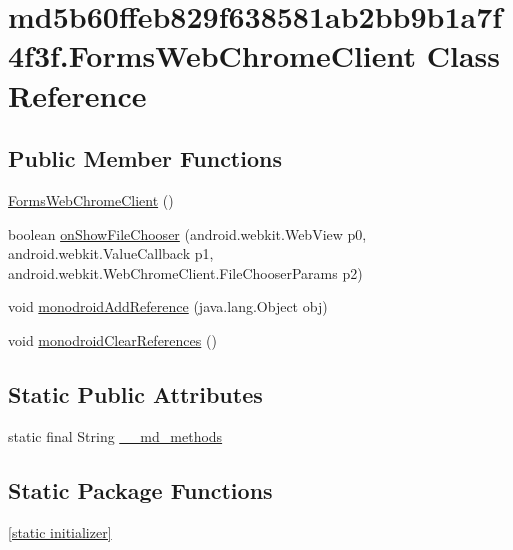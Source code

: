 \hypertarget{classmd5b60ffeb829f638581ab2bb9b1a7f4f3f_1_1_forms_web_chrome_client}{
\section{md5b60ffeb829f638581ab2bb9b1a7f4f3f.FormsWebChromeClient Class Reference}
\label{classmd5b60ffeb829f638581ab2bb9b1a7f4f3f_1_1_forms_web_chrome_client}
}
\subsection*{Public Member Functions}
\begin{CompactItemize}
\item 
\hyperlink{classmd5b60ffeb829f638581ab2bb9b1a7f4f3f_1_1_forms_web_chrome_client_c303a89a6191088c88020e6de82fe7db}{FormsWebChromeClient} ()
\item 
boolean \hyperlink{classmd5b60ffeb829f638581ab2bb9b1a7f4f3f_1_1_forms_web_chrome_client_870ec31fb8f8d9e959487609161690fc}{onShowFileChooser} (android.webkit.WebView p0, android.webkit.ValueCallback p1, android.webkit.WebChromeClient.FileChooserParams p2)
\item 
void \hyperlink{classmd5b60ffeb829f638581ab2bb9b1a7f4f3f_1_1_forms_web_chrome_client_9a31a7d0228c24952476bc4cfc6e78df}{monodroidAddReference} (java.lang.Object obj)
\item 
void \hyperlink{classmd5b60ffeb829f638581ab2bb9b1a7f4f3f_1_1_forms_web_chrome_client_e810253c0c2adc00084f02ce56257c9c}{monodroidClearReferences} ()
\end{CompactItemize}
\subsection*{Static Public Attributes}
\begin{CompactItemize}
\item 
static final String \hyperlink{classmd5b60ffeb829f638581ab2bb9b1a7f4f3f_1_1_forms_web_chrome_client_cdbbbfa40f7a32b9cc6eaabbd04669e5}{\_\-\_\-md\_\-methods}
\end{CompactItemize}
\subsection*{Static Package Functions}
\begin{CompactItemize}
\item 
\hyperlink{classmd5b60ffeb829f638581ab2bb9b1a7f4f3f_1_1_forms_web_chrome_client_533f114784b7a83a7e88f345aabfa9f4}{\mbox{[}static initializer\mbox{]}}
\end{CompactItemize}
